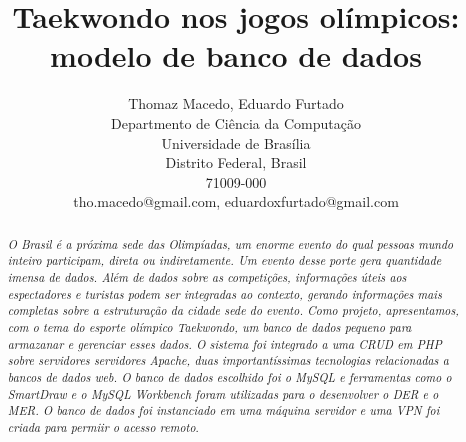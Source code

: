 \documentclass[10pt]{article}
\begin{document}
\title{Taekwondo nos jogos olímpicos: modelo de banco de dados}%
\date{}
\maketitle

\begin{center}
\author{Thomaz Macedo,  Eduardo Furtado\\Departmento de Ciência da Computação\\
Universidade de Brasília\\
Distrito Federal, Brasil\\
71009-000\\
tho.macedo@gmail.com, eduardoxfurtado@gmail.com
}
\end{center}

\begin{abstract}
\emph{O Brasil é a próxima sede das Olimpíadas, um enorme evento do qual pessoas mundo inteiro participam, direta ou indiretamente.  Um evento desse porte gera quantidade imensa de dados. Além de dados sobre as competições, informações úteis aos espectadores e turistas podem ser integradas ao contexto, gerando informações mais completas sobre a estruturação da cidade sede do evento. Como projeto, apresentamos, com o tema do esporte olímpico Taekwondo, um banco de dados pequeno para armazanar e gerenciar esses dados. O sistema foi integrado a uma  CRUD em  PHP sobre servidores servidores Apache, duas importantíssimas tecnologias relacionadas a bancos de dados web.  O banco de dados escolhido foi o MySQL e ferramentas como o SmartDraw e o MySQL Workbench foram utilizadas para o desenvolver o DER e o MER. O banco de dados foi instanciado em uma máquina servidor e uma VPN foi criada para permiir o acesso remoto}. \\ \\ \\
\end{abstract}
\end{document}
